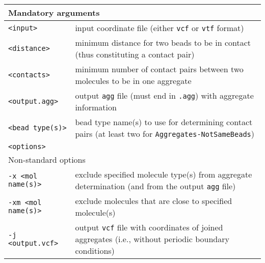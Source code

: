 \vspace{1em}
\noindent
\begin{longtable}{p{}p{}}
  \toprule
  \multicolumn{2}{l}{Mandatory arguments} \\
  \midrule
  \texttt{<input>} & input coordinate file (either \texttt{vcf} or
    \texttt{vtf} format) \\
  \texttt{<distance>} & minimum distance for two beads to be in contact
    (thus constituting a contact pair) \\
  \texttt{<contacts>} & minimum number of contact pairs between two
    molecules to be in one aggregate \\
  \texttt{<output.agg>} & output \texttt{agg} file (must end in
    \texttt{.agg}) with aggregate information \\
  \texttt{<bead type(s)>} & bead type name(s) to use for determining
    contact pairs (at least two for \texttt{Aggregates-NotSameBeads}) \\
  \texttt{<options>} & \\
  \toprule
  \multicolumn{2}{l}{Non-standard options} \\
  \midrule
  \texttt{-x <mol name(s)>} & exclude specified molecule type(s) from
    aggregate determination (and from the output \texttt{agg} file) \\
  \texttt{-xm <mol name(s)>} & exclude molecules that are close to
    specified molecule(s) \\
  \texttt{-j <output.vcf>} & output \texttt{vcf} file with coordinates of
    joined aggregates (i.e., without periodic boundary conditions) \\
  \bottomrule
\end{longtable}
